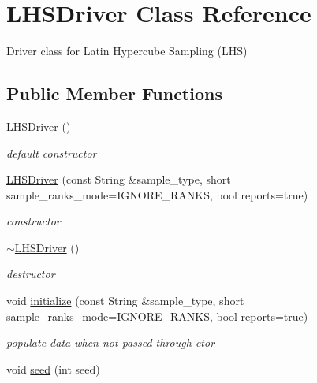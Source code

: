 \section{L\+H\+S\+Driver Class Reference}
\label{classPecos_1_1LHSDriver}


Driver class for Latin Hypercube Sampling (L\+HS)  


\subsection*{Public Member Functions}
\begin{DoxyCompactItemize}
\item 
\hyperlink{classPecos_1_1LHSDriver_a63f7ee20058ada4b708b70a7141d6e88}{L\+H\+S\+Driver} ()\label{classPecos_1_1LHSDriver_a63f7ee20058ada4b708b70a7141d6e88}

\begin{DoxyCompactList}\small\item\em default constructor \end{DoxyCompactList}\item 
\hyperlink{classPecos_1_1LHSDriver_a59f03e1cdfb2ddb52b595330656595f6}{L\+H\+S\+Driver} (const String \&sample\+\_\+type, short sample\+\_\+ranks\+\_\+mode=I\+G\+N\+O\+R\+E\+\_\+\+R\+A\+N\+KS, bool reports=true)\label{classPecos_1_1LHSDriver_a59f03e1cdfb2ddb52b595330656595f6}

\begin{DoxyCompactList}\small\item\em constructor \end{DoxyCompactList}\item 
\hyperlink{classPecos_1_1LHSDriver_a2e2bf01d3e26e194124fadb43f00609a}{$\sim$\+L\+H\+S\+Driver} ()\label{classPecos_1_1LHSDriver_a2e2bf01d3e26e194124fadb43f00609a}

\begin{DoxyCompactList}\small\item\em destructor \end{DoxyCompactList}\item 
void \hyperlink{classPecos_1_1LHSDriver_a7a959ceea818c488ad082f91dd3f3d74}{initialize} (const String \&sample\+\_\+type, short sample\+\_\+ranks\+\_\+mode=I\+G\+N\+O\+R\+E\+\_\+\+R\+A\+N\+KS, bool reports=true)\label{classPecos_1_1LHSDriver_a7a959ceea818c488ad082f91dd3f3d74}

\begin{DoxyCompactList}\small\item\em populate data when not passed through ctor \end{DoxyCompactList}\item 
void \hyperlink{classPecos_1_1LHSDriver_ad857540cd2836f32986cf920e68b9de3}{seed} (int seed)\label{classPecos_1_1LHSDriver_ad857540cd2836f32986cf920e68b9de3}


\end{DoxyCompactItemize}
